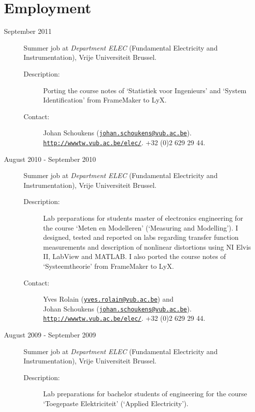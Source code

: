 \documentclass[a4paper]{article}
\begin{document}
\section*{Employment}
\begin{description}
  \item[September 2011] Summer job at \textit{Department ELEC} (Fundamental Electricity and Instrumentation), Vrije Universiteit Brussel.
    \begin{description}
     \item [Description:] Porting the course notes of `Statistiek voor Ingenieurs' and `System Identification' from FrameMaker to LyX.
     \item [Contact:]
     Johan Schoukens (\href{mailto:johan.schoukens@vub.ac.be}{\tt johan.schoukens@vub.ac.be}).\\
     \href{http://wwwtw.vub.ac.be/elec/}{\tt http://wwwtw.vub.ac.be/elec/}.
     +32 (0)2 629 29 44.
    \end{description}
  \item[August 2010 - September 2010] Summer job at \textit{Department ELEC} (Fundamental Electricity and Instrumentation), Vrije Universiteit Brussel.
    \begin{description}
     \item [Description:] Lab preparations for students master of electronics engineering for the course `Meten en Modelleren' (`Measuring and Modelling').
           I designed, tested and reported on labs regarding transfer function measurements and description of nonlinear distortions using NI Elvis II, LabView and MATLAB. I also ported the course notes of `Systeemtheorie' from FrameMaker to LyX.
     \item [Contact:]
     Yves Rolain (\href{mailto:yves.rolain@vub.ac.be}{\tt yves.rolain@vub.ac.be}) and\\
     Johan Schoukens (\href{mailto:johan.schoukens@vub.ac.be}{\tt johan.schoukens@vub.ac.be}).\\
     \href{http://wwwtw.vub.ac.be/elec/}{\tt http://wwwtw.vub.ac.be/elec/}.
     +32 (0)2 629 29 44.
    \end{description}
  \item[August 2009 - September 2009] Summer job at \textit{Department ELEC} (Fundamental Electricity and Instrumentation), Vrije Universiteit Brussel. 
    \begin{description}
     \item [Description:] Lab preparations for bachelor students of engineering for the course \\`Toegepaste Elektriciteit' (`Applied Electricity').

\end{description}
\end{description}
\end{document}
